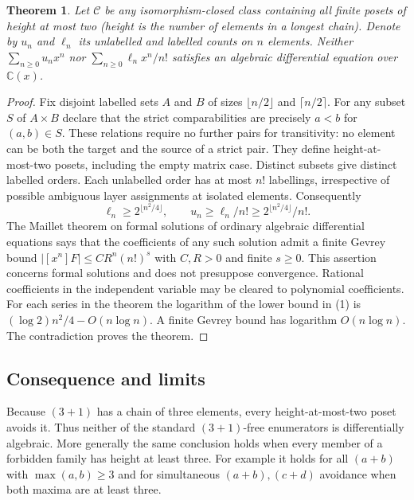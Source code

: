 \documentclass[11pt,a4paper]{article}
\numberwithin{equation}{section}
\newtheorem{theorem}{Theorem}[section]
\theoremstyle{definition}
\theoremstyle{remark}
\begin{document}
\begin{theorem}
Let $\mathcal C$ be any isomorphism-closed class containing all
finite posets of height at most two (height is the number of elements
in a longest chain). Denote by $u_n$ and $\ell_n$ its unlabelled and
labelled counts on $n$ elements. Neither
$\sum_{n\ge0}u_nx^n$ nor $\sum_{n\ge0}\ell_n x^n/n!$
satisfies an algebraic differential equation over $\mathbb C(x)$.
\end{theorem}
\begin{proof}
Fix disjoint labelled sets $A$ and $B$ of sizes $\lfloor n/2\rfloor$
and $\lceil n/2\rceil$. For any subset $S$ of $A\times B$ declare
that the strict comparabilities are precisely $a<b$ for $(a,b)\in S$.
These relations require no further pairs for transitivity: no element
can be both the target and the source of a strict pair. They define
height-at-most-two posets, including the empty matrix case. Distinct
subsets give distinct labelled orders. Each unlabelled order has at
most $n!$ labellings, irrespective of possible ambiguous layer
assignments at isolated elements. Consequently
\[
 \ell_n\ge 2^{\lfloor n^2/4\rfloor},\qquad
 u_n\ge\ell_n/n!\ge 2^{\lfloor n^2/4\rfloor}/n!.
\tag{1}
\]
The Maillet theorem on formal solutions of ordinary algebraic
differential equations \cite{r44taisho:MM} says that the coefficients of any
such solution admit a finite Gevrey bound
$|[x^n]F|\le C R^n(n!)^s$ with $C,R>0$ and finite $s\ge0$.
This assertion concerns formal solutions and does not presuppose
convergence. Rational coefficients in the independent variable may
be cleared to polynomial coefficients. For each series in the theorem
the logarithm of the lower bound in (1) is
$(\log 2)n^2/4-O(n\log n)$. A finite Gevrey bound has logarithm
$O(n\log n)$. The contradiction proves the theorem.
\end{proof}

\subsection*{Consequence and limits}
Because $(3+1)$ has a chain of three elements, every height-at-most-two
poset avoids it. Thus neither of the standard $(3+1)$-free
enumerators is differentially algebraic. More generally the same
conclusion holds when every member of a forbidden family has height
at least three. For example it holds for all $(a+b)$ with
$\max(a,b)\ge3$ and for simultaneous $(a+b),(c+d)$ avoidance when
both maxima are at least three.
\end{document}
